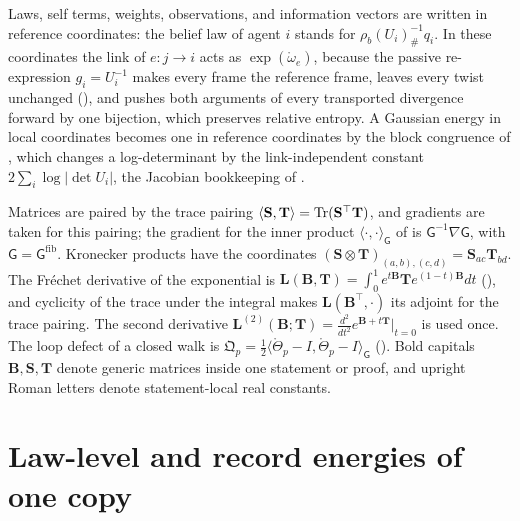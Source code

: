 Laws, self terms, weights, observations, and information vectors are written in reference
coordinates: the belief law of agent \(i\) stands for \(\rho_b(U_i)^{-1}_\#q_i\). In these
coordinates the link of \(e:j\to i\) acts as \(\exp(\mathring\omega_e)\), because the passive
re-expression \(g_i=U_i^{-1}\) makes every frame the reference frame, leaves every twist unchanged
(), and pushes both arguments of every transported divergence
forward by one bijection, which preserves relative entropy. A Gaussian energy in local coordinates
becomes one in reference coordinates by the block congruence of
, which changes a log-determinant by the
link-independent constant \(2\sum_i\log\lvert\det U_i\rvert\), the Jacobian bookkeeping of
.

Matrices are paired by the trace pairing \(\langle\mathbf S,\mathbf T\rangle=\operatorname{Tr}(\mathbf S^\top\mathbf T)\),
and gradients are taken for this pairing; the gradient for the inner product
\(\langle\cdot,\cdot\rangle_{\mathsf G}\) of  is \(\mathsf G^{-1}\nabla\mathsf G\), with
\(\mathsf G=\mathsf G^{\mathrm{fib}}\). Kronecker products have the coordinates
\((\mathbf S\otimes\mathbf T)_{(a,b),(c,d)}=\mathbf S_{ac}\mathbf T_{bd}\). The Fr\'echet derivative of the
exponential is \(\mathbf L(\mathbf B,\mathbf T)=\int_0^1e^{t\mathbf B}\mathbf Te^{(1-t)\mathbf B}dt\)
(), and cyclicity of the trace under the integral makes
\(\mathbf L(\mathbf B^\top,\cdot)\) its adjoint for the trace pairing. The second derivative
\(\mathbf L^{(2)}(\mathbf B;\mathbf T)=\frac{d^2}{dt^2}e^{\mathbf B+t\mathbf T}\big|_{t=0}\) is used once. The loop
defect of a closed walk is
\(\mathfrak Q_p=\tfrac12\langle\mathring\Theta_p-I,\mathring\Theta_p-I\rangle_{\mathsf G}\)
(). Bold capitals \(\mathbf B,\mathbf S,\mathbf T\) denote generic matrices
inside one statement or proof, and upright Roman letters denote statement-local real constants.

\section{Law-level and record energies of one copy}
\label{sec:glink-energies}

